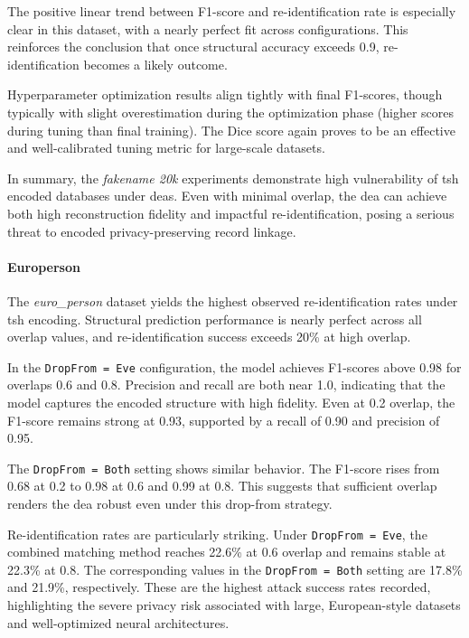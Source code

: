 The positive linear trend between F1-score and re-identification rate is especially clear in this dataset, with a nearly perfect fit across configurations.
This reinforces the conclusion that once structural accuracy exceeds 0.9, re-identification becomes a likely outcome.

Hyperparameter optimization results align tightly with final F1-scores, though typically with slight overestimation during the optimization phase (higher scores during tuning than final training).
The Dice score again proves to be an effective and well-calibrated tuning metric for large-scale datasets.

In summary, the \textit{fakename 20k} experiments demonstrate high vulnerability of \ac{tsh} encoded databases under \ac{dea}s.
Even with minimal overlap, the \ac{dea} can achieve both high reconstruction fidelity and impactful re-identification, posing a serious threat to encoded privacy-preserving record linkage.


\paragraph{Europerson}

The \textit{euro\_person} dataset yields the highest observed re-identification rates under \ac{tsh} encoding.
Structural prediction performance is nearly perfect across all overlap values, and re-identification success exceeds 20\% at high overlap.

In the \texttt{DropFrom = Eve} configuration, the model achieves F1-scores above 0.98 for overlaps 0.6 and 0.8.
Precision and recall are both near 1.0, indicating that the model captures the encoded structure with high fidelity.
Even at 0.2 overlap, the F1-score remains strong at 0.93, supported by a recall of 0.90 and precision of 0.95.

The \texttt{DropFrom = Both} setting shows similar behavior.
The F1-score rises from 0.68 at 0.2 to 0.98 at 0.6 and 0.99 at 0.8.
This suggests that sufficient overlap renders the \ac{dea} robust even under this drop-from strategy.

Re-identification rates are particularly striking.
Under \texttt{DropFrom = Eve}, the combined matching method reaches 22.6\% at 0.6 overlap and remains stable at 22.3\% at 0.8.
The corresponding values in the \texttt{DropFrom = Both} setting are 17.8\% and 21.9\%, respectively.
These are the highest attack success rates recorded, highlighting the severe privacy risk associated with large, European-style datasets and well-optimized neural architectures.

